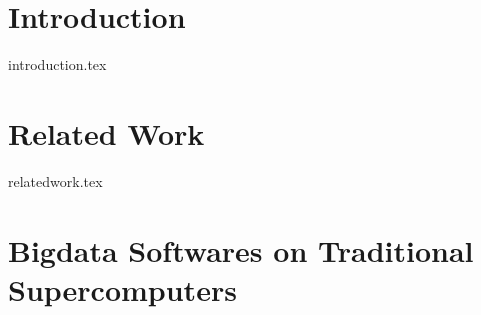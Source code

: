 \documentclass[conference]{IEEEtran}
\begin{document}




\maketitle


\begin{abstract}
 {abstract.tex}
\end{abstract}


%
\IEEEpeerreviewmaketitle



\section {Introduction}
 {introduction.tex}

\section {Related Work} \label{Related Work}
 {relatedwork.tex}



\section {Bigdata Softwares on Traditional Supercomputers} \label{Bigdata Softwares on Traditional Supercomputers}
\end{document}
